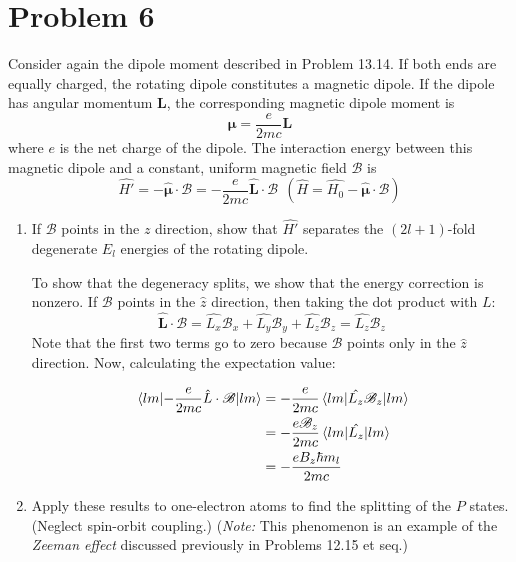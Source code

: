 \documentclass[10pt]{article}
\begin{document}
		\section*{Problem 6}
		Consider again the dipole moment described in Problem 13.14. If both ends are equally charged,
		the rotating dipole constitutes a magnetic dipole. If the dipole has angular momentum 
		$\mathbf L$, the corresponding magnetic dipole moment is \[
		\boldsymbol \mu = \frac{e}{2mc}\mathbf L
		\] where $e$ is the net charge of the dipole. The interaction energy between this magnetic
		dipole and a constant, uniform magnetic field $\mathscr B$ is \[
				\hat{H'} = -\hat{\boldsymbol \mu}\cdot \mathscr B = -\frac{e}{2mc}\mathbf{\hat{L}}
				\cdot \mathscr B \ \ (\hat{H} = \hat{H_0} - \hat{\boldsymbol \mu} \cdot \mathscr B)
		\] 
		\begin{enumerate}[label=\alph*)]
				\item If $\mathscr B$ points in the $z$ direction, show that $\hat{H'}$ separates
						the $(2l+1)$-fold degenerate $E_l$ energies of the rotating dipole.

						\begin{solution}
								To show that the degeneracy splits, we show that the energy correction is 
								nonzero. If $\mathscr B$ points in the $\hat{z}$ direction, then taking the dot
								product with $L$:
								\[
								\hat{\mathbf L} \cdot \mathscr B = \hat{L_x}\mathscr B_x + \hat{L_y}\mathscr B_y
								+ \hat{L_z} \mathscr B_z = \hat{L_z}\mathscr B_z
								\] 
								Note that the first two terms go to zero because $\mathscr B$ points only in the
								$\hat{z}$ direction. Now, calculating the expectation value:

								\begin{align*}
										\expval{-\frac{e}{2mc}\hat{L}\cdot \mathscr{B}}{lm} &= -\frac{e}{2mc}
										\expval{\hat{L_z} \mathscr B_z}{lm} \\
										&= -\frac{e\mathscr B_z}{2mc}\expval{\hat{L_z}}{lm}	\\
										&= -\frac{eB_z\hbar m_l}{2mc}
								\end{align*}

						\end{solution}
				\item Apply these results to one-electron atoms to find the splitting of the $P$ 
						states. (Neglect spin-orbit coupling.) (\textit{Note:} This phenomenon is an 
						example of the \textit{Zeeman effect} discussed previously in Problems 12.15
						et seq.)


\end{enumerate}
\end{document}
